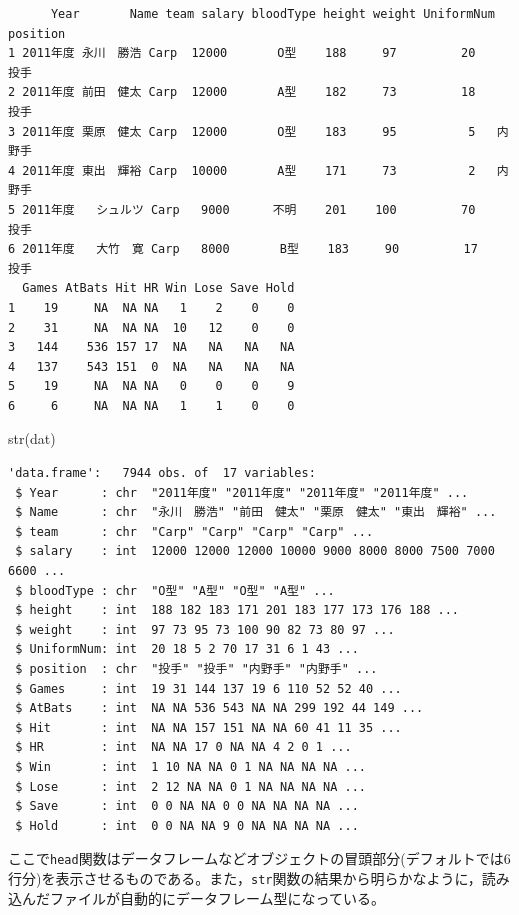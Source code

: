 \documentclass[
  a4paper,
]{ltjsbook}
\newenvironment{Shaded}{\begin{snugshade}}{\end{snugshade}}
\newcommand{\FunctionTok}[1]{\textcolor[rgb]{0.28,0.35,0.67}{#1}}
\newcommand{\NormalTok}[1]{\textcolor[rgb]{0.00,0.23,0.31}{#1}}
\begin{document}
\begin{verbatim}
      Year       Name team salary bloodType height weight UniformNum position
1 2011年度 永川　勝浩 Carp  12000       O型    188     97         20     投手
2 2011年度 前田　健太 Carp  12000       A型    182     73         18     投手
3 2011年度 栗原　健太 Carp  12000       O型    183     95          5   内野手
4 2011年度 東出　輝裕 Carp  10000       A型    171     73          2   内野手
5 2011年度   シュルツ Carp   9000      不明    201    100         70     投手
6 2011年度   大竹　寛 Carp   8000       B型    183     90         17     投手
  Games AtBats Hit HR Win Lose Save Hold
1    19     NA  NA NA   1    2    0    0
2    31     NA  NA NA  10   12    0    0
3   144    536 157 17  NA   NA   NA   NA
4   137    543 151  0  NA   NA   NA   NA
5    19     NA  NA NA   0    0    0    9
6     6     NA  NA NA   1    1    0    0
\end{verbatim}

\begin{Shaded}
\begin{Highlighting}[]
\FunctionTok{str}\NormalTok{(dat)}
\end{Highlighting}
\end{Shaded}

\begin{verbatim}
'data.frame':   7944 obs. of  17 variables:
 $ Year      : chr  "2011年度" "2011年度" "2011年度" "2011年度" ...
 $ Name      : chr  "永川　勝浩" "前田　健太" "栗原　健太" "東出　輝裕" ...
 $ team      : chr  "Carp" "Carp" "Carp" "Carp" ...
 $ salary    : int  12000 12000 12000 10000 9000 8000 8000 7500 7000 6600 ...
 $ bloodType : chr  "O型" "A型" "O型" "A型" ...
 $ height    : int  188 182 183 171 201 183 177 173 176 188 ...
 $ weight    : int  97 73 95 73 100 90 82 73 80 97 ...
 $ UniformNum: int  20 18 5 2 70 17 31 6 1 43 ...
 $ position  : chr  "投手" "投手" "内野手" "内野手" ...
 $ Games     : int  19 31 144 137 19 6 110 52 52 40 ...
 $ AtBats    : int  NA NA 536 543 NA NA 299 192 44 149 ...
 $ Hit       : int  NA NA 157 151 NA NA 60 41 11 35 ...
 $ HR        : int  NA NA 17 0 NA NA 4 2 0 1 ...
 $ Win       : int  1 10 NA NA 0 1 NA NA NA NA ...
 $ Lose      : int  2 12 NA NA 0 1 NA NA NA NA ...
 $ Save      : int  0 0 NA NA 0 0 NA NA NA NA ...
 $ Hold      : int  0 0 NA NA 9 0 NA NA NA NA ...
\end{verbatim}

ここで\texttt{head}関数はデータフレームなどオブジェクトの冒頭部分(デフォルトでは6行分)を表示させるものである。また，\texttt{str}関数の結果から明らかなように，読み込んだファイルが自動的にデータフレーム型になっている。
\end{document}
